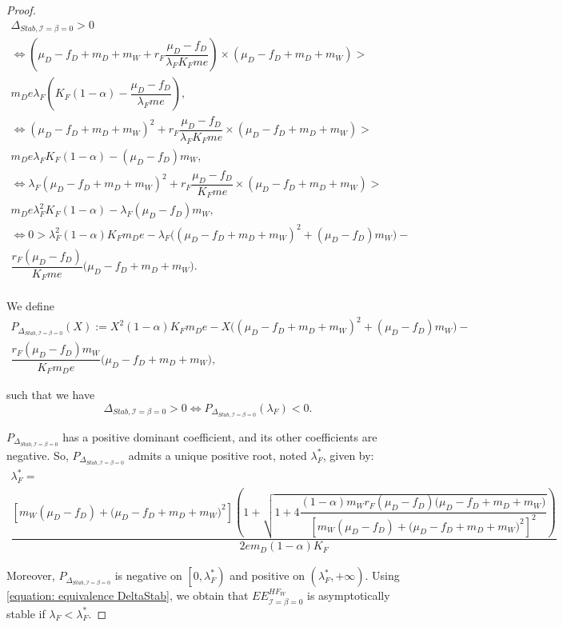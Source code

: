 \documentclass{article}
\newcommand{\lfw}{\lambda_{F}}
\newcommand{\lfw}{\lambda_{F}}
\newcommand{\cI}{\mathcal{I}}
\theoremstyle{definition}
\theoremstyle{remark}
\begin{document}
\begin{appendix}
\begin{proof}
\begin{multline*}
\Delta_{Stab, \cI=\beta = 0} > 0 \\
\Leftrightarrow \left(\mu_D - f_D + m_D + m_W + r_F \dfrac{\mu_D - f_D}{\lfw K_F m e} \right) \times   \left( \mu_D -f_D + m_D + m_W \right) > \\ m_D e \lfw \left(K_F(1-\alpha) - \dfrac{\mu_D - f_D}{\lfw m e} \right), \\
\Leftrightarrow (\mu_D - f_D + m_D + m_W)^2 + r_F \dfrac{\mu_D - f_D}{\lfw K_F m e}  \times   \left( \mu_D -f_D + m_D + m_W \right) > \\ m_D e \lfw K_F(1-\alpha) - (\mu_D - f_D)m_W , \\
\Leftrightarrow \lfw (\mu_D - f_D + m_D + m_W)^2 + r_F \dfrac{\mu_D - f_D}{K_F m e}  \times   \left( \mu_D -f_D + m_D + m_W \right) > \\ m_D e \lfw^2 K_F(1-\alpha) - \lfw (\mu_D - f_D)m_W , \\
\Leftrightarrow 0 > \lfw^2 (1-\alpha) K_F  m_D e - \lfw \Big((\mu_D - f_D + m_D + m_W)^2 +(\mu_D - f_D)m_W \Big) - \\ \dfrac{r_F (\mu_D - f_D) }{K_F m e}  \big( \mu_D -f_D + m_D + m_W \big).\\
\end{multline*}

We define 
\begin{multline*}
P_{\Delta_{Stab, \cI= \beta = 0}}(X) := X^2 (1-\alpha) K_F  m_D e - X \Big((\mu_D - f_D + m_D + m_W)^2 +(\mu_D - f_D)m_W \Big) - \\ \dfrac{r_F (\mu_D - f_D) m_W}{K_F m_D e}  \big( \mu_D -f_D + m_D + m_W \big),
\end{multline*} 

such that we have 
\begin{equation}
\Delta_{Stab, \cI= \beta = 0} > 0 \Leftrightarrow P_{\Delta_{Stab, \cI= \beta = 0}}(\lfw) < 0.
\label{equation: equivalence DeltaStab}
\end{equation}

$P_{\Delta_{Stab, \cI = \beta = 0}}$ has a positive dominant coefficient, and its other coefficients are negative. So,  $P_{\Delta_{Stab, \cI= \beta = 0}}$ admits a unique positive root, noted $\lfw^*$, given by:
\begin{multline}
\lfw^* = \\
 \dfrac{\left[m_{W}(\mu_{D}-f_{D})+\big(\mu_{D}-f_{D}+m_{D}+m_{W})^{2}\right]\left(1+\sqrt{1+4\dfrac{(1-\alpha)m_{W}r_{F}\left(\mu_{D}-f_{D}\right)\big(\mu_{D}-f_{D}+m_{D}+m_{W})}{\left[m_{W}(\mu_{D}-f_{D})+\big(\mu_{D}-f_{D}+m_{D}+m_{W})^{2}\right]^{2}}}\right)}{2em_D (1-\alpha) K_F }
\end{multline}

Moreover, $P_{\Delta_{Stab, \cI = \beta = 0}}$ is negative on $\left[0, \lfw^* \right)$ and positive on $\left(\lfw ^*, +\infty \right)$. Using \eqref{equation: equivalence DeltaStab}, we obtain that $EE^{HF_W}_{\cI = \beta = 0}$ is asymptotically stable if $\lfw  < \lfw ^*$.
\end{proof}

\end{appendix}



\newpage



\end{document}
